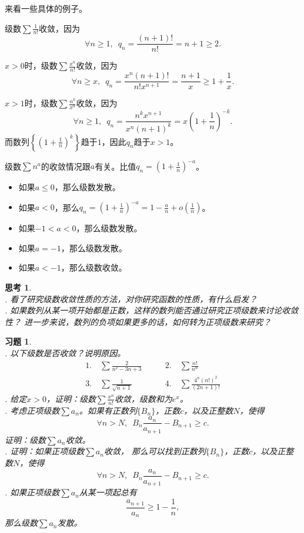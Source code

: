 \documentclass[12pt,UTF8]{ctexbook}
\newcommand{\olim}[1]{\mathit{o}\left(#1\right)}  %
\newtheorem{sk}{思考}[section]
\newtheorem{xt}{习题}[section]
\begin{document}
来看一些具体的例子。

级数$\sum \frac{1}{n!}$收敛，因为
$$\forall n \geqslant 1,  \,\,\,q_n = \frac{(n+1)!}{n!} = n+1 \geqslant 2. $$

$x>0$时，级数$\sum \frac{x^n}{n!}$收敛，因为
$$\forall n \geqslant x,  \,\,\,q_n = \frac{x^n (n+1)!}{n! x^{n+1}} = \frac{n+1}{x} \geqslant 1 + \frac{1}{x}. $$


$x>1$时，级数$\sum \frac{n^k}{x^n}$收敛，因为
$$\forall n \geqslant 1,  \,\,\,q_n = \frac{n^k x^{n+1}}{x^n (n+1)^{k}} = x\left(1 + \frac{1}{n}\right)^{-k}. $$
而数列$\left\{\left(1 + \frac{1}{n}\right)^k\right\}$趋于$1$，因此$q_n$趋于$x>1$。

级数$\sum n^a$的收敛情况跟$a$有关。比值$q_n = \left(1 + \frac{1}{n}\right)^{-a}$。
\begin{itemize}
    \item 如果$a\leqslant 0$，那么级数发散。
    \item 如果$a<0$，那么$q_n = \left(1 + \frac{1}{n}\right)^{-a} = 1 - \frac{a}{n} + \olim{\frac{1}{n}}$。
    \item 如果$-1 < a < 0$，那么级数发散。
    \item 如果$a = -1$，那么级数发散。
    \item 如果$a < -1$，那么级数收敛。
\end{itemize}

\begin{sk}
    \mbox{} \\
    . 看了研究级数收敛性质的方法，对你研究函数的性质，有什么启发？\\
    . 如果数列从某一项开始都是正数，这样的数列能否通过研究正项级数来讨论收敛性？
    进一步来说，数列的负项如果更多的话，如何转为正项级数来研究？
\end{sk}

\begin{xt}
    \mbox{} \\
    . 以下级数是否收敛？说明原因。
    $$
    \begin{array}{ll}
        1. \quad \sum \frac{2}{n^2 - 3n + 3} \qquad &2. \quad \sum \frac{n!}{n^n} \\
        3. \quad \sum \frac{1}{\sqrt{n + 1}} \qquad &4. \quad \sum \frac{4^n (n!)^2}{(2n + 1)!} 
    \end{array}
    $$
    . 给定$x>0$，证明：级数$\sum \frac{x^n}{n!}$收敛，级数和为$e^x$。\\
    . 考虑正项级数$\sum a_n$。如果有正数列$\{B_n\}$，正数$c$，以及正整数$N$，使得
    $$ \forall n > N, \,\,\, B_n \frac{a_n}{a_{n+1}} - B_{n+1} \geqslant c. $$
    证明：级数$\sum a_n$收敛。\\
    . 证明：如果正项级数$\sum a_n$收敛，
    那么可以找到正数列$\{B_n\}$，正数$c$，以及正整数$N$，使得
    $$ \forall n > N, \,\,\, B_n \frac{a_n}{a_{n+1}} - B_{n+1} \geqslant c. $$
    . 如果正项级数$\sum a_n$从某一项起总有
    $$ \frac{a_{n+1}}{a_n} \geqslant 1 - \frac{1}{n},$$
    那么级数$\sum a_n$发散。\\

\end{xt}
\end{document}
